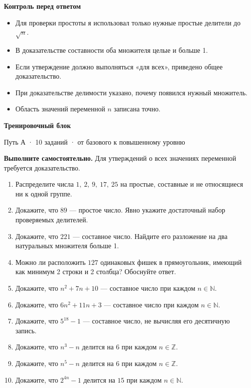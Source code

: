 \documentclass[a4paper,12pt]{article}
\newcommand{\criterion}[1]{\par\textcolor{darkaccent}{\bfseries #1}\par}
\begin{document}
\criterion{Контроль перед ответом}
\begin{itemize}[label=\(\square\)]
\item Для проверки простоты я использовал только нужные простые делители до \(\sqrt n\).
\item В доказательстве составности оба множителя целые и больше 1.
\item Если утверждение должно выполняться «для всех», приведено общее доказательство.
\item При доказательстве делимости указано, почему появился нужный множитель.
\item Область значений переменной \(n\) записана точно.
\end{itemize}

\clearpage
\begin{center}
{\LARGE\color{darkaccent}\bfseries Тренировочный блок}\par
{\normalsize\color{lightgray}Путь А · 10 заданий · от базового к повышенному уровню}\par
\end{center}
\vspace{3mm}
\textbf{Выполните самостоятельно.} Для утверждений о всех значениях переменной требуется доказательство.
\begin{enumerate}[label=\textcolor{accent}{\bfseries\arabic*.},itemsep=0.65em]
\item Распределите числа \(1,\ 2,\ 9,\ 17,\ 25\) на простые, составные и не относящиеся ни к одной группе.
\item Докажите, что \(89\) --- простое число. Явно укажите достаточный набор проверяемых делителей.
\item Докажите, что \(221\) --- составное число. Найдите его разложение на два натуральных множителя больше 1.
\item Можно ли расположить \(127\) одинаковых фишек в прямоугольник, имеющий как минимум 2 строки и 2 столбца? Обоснуйте ответ.
\item Докажите, что \(n^2+7n+10\) --- составное число при каждом \(n\in\mathbb N\).
\item Докажите, что \(6n^2+11n+3\) --- составное число при каждом \(n\in\mathbb N\).
\item Докажите, что \(5^{18}-1\) --- составное число, не вычисляя его десятичную запись.
\item Докажите, что \(n^3-n\) делится на \(6\) при каждом \(n\in\mathbb Z\).
\item Докажите, что \(n^5-n\) делится на \(6\) при каждом \(n\in\mathbb Z\).
\item Докажите, что \(2^{4n}-1\) делится на \(15\) при каждом \(n\in\mathbb N\).
\end{enumerate}
\end{document}
